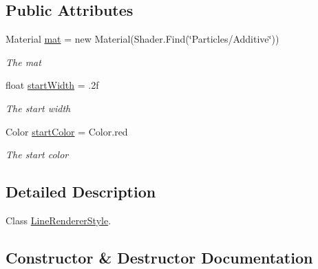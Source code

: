 \subsection*{Public Attributes}
\begin{DoxyCompactItemize}
\item 
Material \hyperlink{class_lerp2_a_p_i_1_1_hepers_1_1_unity___extensions_1_1_utils_1_1_line_renderer_style_afb72019731ee50f1749e98a261358d4f}{mat} = new Material(Shader.\+Find(\char`\"{}Particles/Additive\char`\"{}))
\begin{DoxyCompactList}\small\item\em The mat \end{DoxyCompactList}\item 
float \hyperlink{class_lerp2_a_p_i_1_1_hepers_1_1_unity___extensions_1_1_utils_1_1_line_renderer_style_a20a99bbf0becd29f28cb6b477a5dc47c}{start\+Width} = .\+2f
\begin{DoxyCompactList}\small\item\em The start width \end{DoxyCompactList}\item 
Color \hyperlink{class_lerp2_a_p_i_1_1_hepers_1_1_unity___extensions_1_1_utils_1_1_line_renderer_style_ac0716106d0d4bebaddbc8bb2a9520c20}{start\+Color} = Color.\+red
\begin{DoxyCompactList}\small\item\em The start color \end{DoxyCompactList}\end{DoxyCompactItemize}


\subsection{Detailed Description}
Class \hyperlink{class_lerp2_a_p_i_1_1_hepers_1_1_unity___extensions_1_1_utils_1_1_line_renderer_style}{Line\+Renderer\+Style}. 



\subsection{Constructor \& Destructor Documentation}
\mbox{\label{class_lerp2_a_p_i_1_1_hepers_1_1_unity___extensions_1_1_utils_1_1_line_renderer_style_adce8021204d1344bbc4f4a01c9f0b70b}} 

